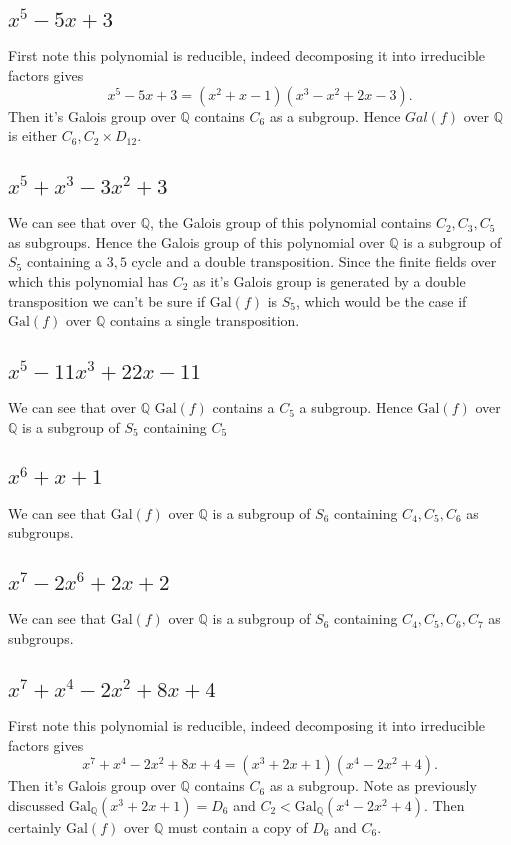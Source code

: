 \documentclass{article}
\begin{document}
\subsection{$ x^5 - 5x + 3$    }
First note this polynomial is reducible,  indeed decomposing it into irreducible factors gives
\[x^5 - 5x + 3=(x^2+x-1)(x^3-x^2+2x-3).    \]
Then it's Galois group over $\mathbb{Q}$ contains $C_6$ as a subgroup. Hence $Gal(f)$ over $\mathbb{Q}$ is either $C_6,C_2\times D_{12}$.



\subsection{$ x^5 + x^3 - 3x^2 + 3$    }
We can see that over $\mathbb{Q}$,  the Galois group of this polynomial contains $C_2,C_3,C_5$ as subgroups.  Hence the Galois group of this polynomial over $\mathbb{Q}$ is a subgroup of $S_5$ containing a $3,5$ cycle and a double transposition.  Since the finite fields over which this polynomial has $C_2$ as it's Galois group is generated by a double transposition we can't be sure if $\text{Gal}(f)$ is $S_5$, which would be the case if $\text{Gal}(f)$ over $\mathbb{Q}$ contains a single transposition.
\subsection{$ x^5 - 11x^3 + 22x - 11 $    }
We can see that over $\mathbb{Q}$ $\text{Gal}(f)$ contains a $C_5$ a subgroup.  Hence $\text{Gal} (f)$ over $\mathbb{Q}$ is a subgroup of $S_5$ containing $C_5$


\subsection{$ x^6 + x + 1 $   }
We can see that $\text{Gal} (f)$ over $\mathbb{Q}$ is a subgroup of $S_6$ containing $C_4,C_5,C_6$ as subgroups. 


\subsection{$ x^7 - 2x^6 + 2x + 2 $    }

We can see that $\text{Gal} (f)$ over $\mathbb{Q}$ is a subgroup of $S_6$ containing $C_4,C_5,C_6,C_7$ as subgroups. 
\subsection{$ x^7 + x^4 - 2x^2 + 8x + 4 $   }
First note this polynomial is reducible,  indeed decomposing it into irreducible factors gives
\[x^7 + x^4 - 2x^2 + 8x + 4=(x^3+2x+1)(x^4-2x^2+4).    \]
Then it's Galois group over $\mathbb{Q}$ contains $C_6$ as a subgroup.  Note as previously discussed $\text{Gal}_\mathbb{Q}(x^3+2x+1)=D_6$ and $C_2< \text{Gal}_\mathbb{Q}(x^4-2x^2+4)$.  Then certainly $\text{Gal} (f)$ over $\mathbb{Q}$ must contain a copy of $D_6$ and $C_6$.
\end{document}
